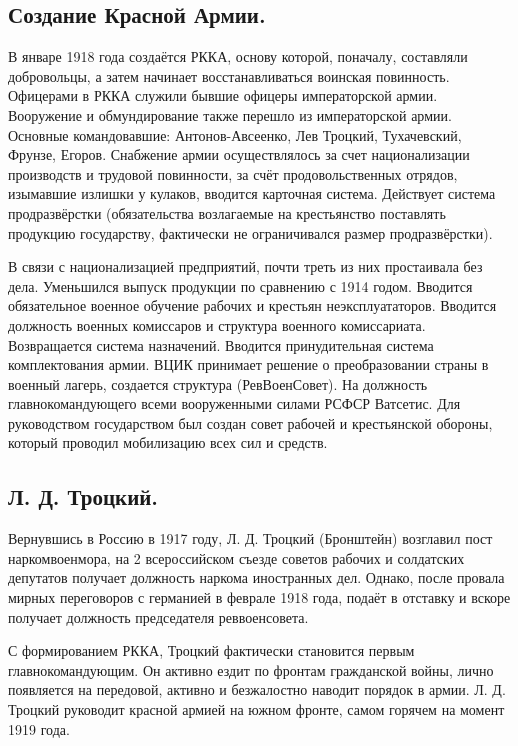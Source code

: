 \subsection{Создание Красной Армии.}

В январе 1918 года создаётся РККА, основу которой, поначалу, составляли добровольцы, а затем начинает восстанавливаться воинская повинность. Офицерами в РККА служили бывшие офицеры императорской армии. Вооружение и обмундирование также перешло из императорской армии. 
Основные командовавшие: Антонов-Авсеенко, Лев Троцкий, Тухачевский, Фрунзе, Егоров.
Снабжение армии осуществлялось за счет национализации производств и трудовой повинности, за счёт продовольственных отрядов, изымавшие излишки у кулаков, вводится карточная система. Действует система продразвёрстки (обязательства возлагаемые на крестьянство поставлять продукцию государству, фактически не ограничивался размер продразвёрстки).

В связи с национализацией предприятий, почти треть из них простаивала без дела. Уменьшился выпуск продукции по сравнению с 1914 годом.
Вводится обязательное военное обучение рабочих и крестьян неэксплуататоров. Вводится должность военных комиссаров и структура военного комиссариата. Возвращается система назначений. Вводится принудительная система комплектования армии.
ВЦИК принимает решение о преобразовании страны в военный лагерь, создается структура (РевВоенСовет). На должность главнокомандующего всеми вооруженными силами РСФСР Ватсетис. Для руководством государством был создан совет рабочей и крестьянской обороны, который проводил мобилизацию всех сил и средств.

\subsection{Л. Д. Троцкий.}

Вернувшись в Россию в 1917 году, Л. Д. Троцкий (Бронштейн) возглавил пост наркомвоенмора, на 2 всероссийском съезде советов рабочих и солдатских депутатов получает должность наркома иностранных дел. Однако, после провала  мирных переговоров с германией в феврале 1918 года, подаёт в отставку и вскоре получает должность председателя реввоенсовета. 

С формированием РККА, Троцкий фактически становится первым главнокомандующим. Он активно ездит по фронтам гражданской войны, лично появляется на передовой, активно и безжалостно наводит порядок в армии. Л. Д. Троцкий руководит красной армией на южном фронте, самом горячем на момент 1919 года.

